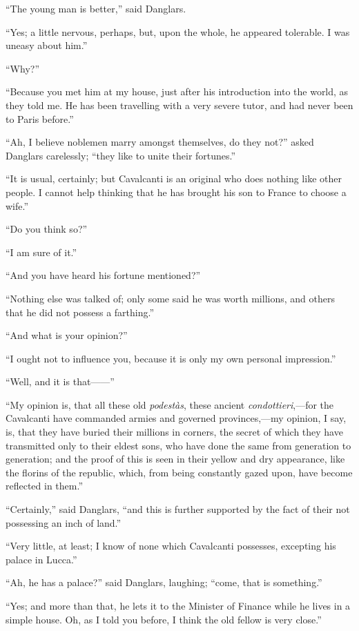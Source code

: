 “The young man is better,” said Danglars.

“Yes; a little nervous, perhaps, but, upon the whole, he appeared
tolerable. I was uneasy about him.”

“Why?”

“Because you met him at my house, just after his introduction into the
world, as they told me. He has been travelling with a very severe
tutor, and had never been to Paris before.”

“Ah, I believe noblemen marry amongst themselves, do they not?” asked
Danglars carelessly; “they like to unite their fortunes.”

“It is usual, certainly; but Cavalcanti is an original who does nothing
like other people. I cannot help thinking that he has brought his son
to France to choose a wife.”

“Do you think so?”

“I am sure of it.”

“And you have heard his fortune mentioned?”

“Nothing else was talked of; only some said he was worth millions, and
others that he did not possess a farthing.”

“And what is your opinion?”

“I ought not to influence you, because it is only my own personal
impression.”

“Well, and it is that——”

“My opinion is, that all these old \textit{podestàs}, these ancient
\textit{condottieri},—for the Cavalcanti have commanded armies and governed
provinces,—my opinion, I say, is, that they have buried their millions
in corners, the secret of which they have transmitted only to their
eldest sons, who have done the same from generation to generation; and
the proof of this is seen in their yellow and dry appearance, like the
florins of the republic, which, from being constantly gazed upon, have
become reflected in them.”

“Certainly,” said Danglars, “and this is further supported by the fact
of their not possessing an inch of land.”

“Very little, at least; I know of none which Cavalcanti possesses,
excepting his palace in Lucca.”

“Ah, he has a palace?” said Danglars, laughing; “come, that is
something.”

“Yes; and more than that, he lets it to the Minister of Finance while
he lives in a simple house. Oh, as I told you before, I think the old
fellow is very close.”

